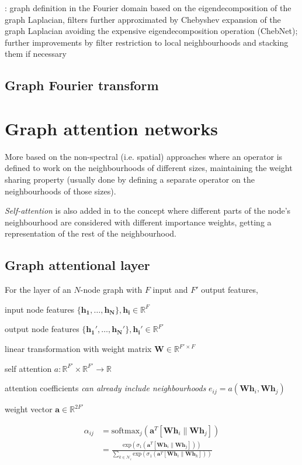 \cite{velickovic2018graph}: graph definition in the Fourier domain based on the eigendecomposition of the graph Laplacian, filters further approximated by Chebyshev expansion of the graph Laplacian avoiding the expensive eigendecomposition operation (ChebNet); further improvements by filter restriction to local neighbourhoods and stacking them if necessary 

\subsection{Graph Fourier transform}


\section{Graph attention networks}
\label{training-gat}
\cite{velickovic2018graph} More based on the non-spectral (i.e. spatial) approaches where an operator is defined to work on the neighbourhoods of different sizes, maintaining the weight sharing property (usually done by defining a separate operator on the neighbourhoods of those sizes).


\textit{Self-attention} is also added in to the concept where different parts of the node's neighbourhood are considered with different importance weights, getting a representation of the rest of the neighbourhood. 


\subsection{Graph attentional layer}
For the layer of an $N$-node graph with $F$ input and $F'$ output features, 

input node features $\{\mathbf{h_1}, \dots, \mathbf{h_N}\}, \mathbf{h_i} \in \mathbb{R}^F$

output node features $\{\mathbf{h_1'}, \dots, \mathbf{h_N'}\}, \mathbf{h_i'} \in \mathbb{R}^{F'}$

linear transformation with weight matrix $\mathbf{W} \in \mathbb{R}^{F' \times F}$

self attention $a: \mathbb{R}^{F'} \times \mathbb{R}^{F'} \rightarrow \mathbb{R}$

attention coefficients \textit{can already include neighbourhoods} $e_{ij} = a(\mathbf{W}\mathbf{h}_i, \mathbf{W}\mathbf{h}_j)$



weight vector $\mathbf{a} \in \mathbb{R}^{2F'}$

\begin{align}
    \alpha_{ij} &= \mathrm{softmax}_j(\mathbf{a}^T[\mathbf{W}\mathbf{h}_i \parallel \mathbf{W}\mathbf{h}_j]) \\
    &=  \frac{\mathrm{exp}(\sigma_1(\mathbf{a}^T[\mathbf{W}\mathbf{h}_i \parallel \mathbf{W}\mathbf{h}_j]))}{\sum\limits_{k \in \mathcal{N}_i}\mathrm{exp}(\sigma_1(\mathbf{a}^T[\mathbf{W}\mathbf{h}_i \parallel \mathbf{W}\mathbf{h}_k]))}
\end{align}

